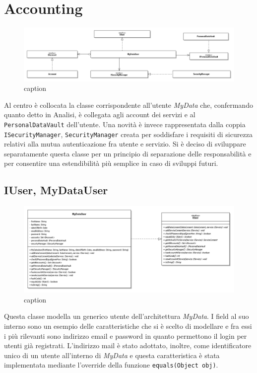 \section{Accounting}
\label{sec:P-accounting}
\begin{figure} [h]
	\includegraphics[width=\linewidth]{pictures/Accounting-closed.png}
	\caption{caption}
	\label{fig:Accounting-closed}
\end{figure}
Al centro \`e collocata la classe corrispondente all’utente \textit{MyData} che, confermando quanto detto in Analisi, \`e collegata agli account dei servizi e al \texttt{PersonalDataVault} dell’utente. Una novit\`a \`e invece rappresentata dalla coppia \texttt{ISecurityManager}, \texttt{SecurityManager} creata per soddisfare i requisiti di sicurezza relativi alla mutua autenticazione fra utente e servizio. Si \`e deciso di sviluppare separatamente questa classe per un principio di separazione delle responsabilit\`a e per consentire una estendibilit\`a pi\`u semplice in caso di sviluppi futuri.

\subsection{IUser, MyDataUser}
\begin{figure} [h]
	\includegraphics[width=\linewidth]{pictures/Accounting-MyDataUsr.png}
	\caption{caption}
	\label{fig:Accounting-MyDatUsr}
\end{figure}
Questa classe modella un generico utente dell’architettura \textit{MyData}. I field al suo interno sono un esempio delle caratteristiche che si \`e scelto di modellare e fra essi i pi\`u rilevanti sono indirizzo email e password in quanto permettono il login per utenti gi\`a registrati. L’indirizzo mail \`e stato adottato, inoltre, come identificatore unico di un utente all’interno di \textit{MyData} e questa caratteristica \`e stata implementata mediante l’override della funzione \texttt{equals(Object obj)}.

